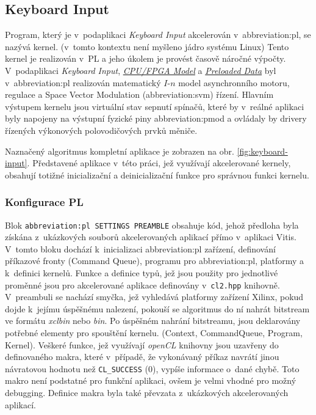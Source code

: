 \documentclass[a4paper, twoside, 11pt]{article}
\newcommand{\fbar}{\FloatBarrier}
\begin{document}
	\fbar
	\subsection{Keyboard Input}\label{subsec:keyboard-input}
		Program, který je v~podaplikaci \textit{Keyboard Input} akcelerován v~\gls{abbreviation:pl}, se nazývá kernel. (v~tomto kontextu není myšleno jádro systému Linux) Tento kernel je realizován v~PL a jeho úkolem je provést časově náročné výpočty. V~podaplikaci \textit{Keyboard Input}, \hyperref[subsec:cpu-fpga]{\textit{CPU/FPGA Model}} a \hyperref[subsec:preloaded-data]{\textit{Preloaded Data}} byl v~\gls{abbreviation:pl} realizován matematický $I$-$n$ model asynchronního motoru, regulace a Space Vector Modulation (\gls{abbreviation:svm}) řízení. Hlavním výstupem kernelu jsou virtuální stav sepnutí spínačů, které by v~reálné aplikaci byly napojeny na výstupní fyzické piny \gls{abbreviation:pmod} a ovládaly by drivery řízených výkonových polovodičových prvků měniče.\par
		Naznačený algoritmus kompletní aplikace je zobrazen na obr. \ref{fig:keyboard-input}. Představené aplikace v~této práci, jež využívají akcelerované kernely, obsahují totižné inicializační a deinicializační funkce pro správnou funkci kernelu.\par
		\subsubsection{Konfigurace PL}
		Blok \texttt{\gls{abbreviation:pl} SETTINGS PREAMBLE} obsahuje kód, jehož předloha byla získána z~ukázkových souborů akcelerovaných aplikací přímo v~aplikaci Vitis. V~tomto bloku dochází k~inicializaci \gls{abbreviation:pl} zařízení, definování příkazové fronty (Command Queue), programu pro \gls{abbreviation:pl}, platformy a k~definici kernelů. Funkce a definice typů, jež jsou použity pro jednotlivé proměnné jsou pro akcelerované aplikace definovány v~\texttt{cl2.hpp} knihovně. V~preambuli se nachází smyčka, jež vyhledává platformy zařízení Xilinx, pokud dojde k~jejímu úspěšnému nalezení, pokouší se algoritmus do ní nahrát bitstream ve formátu \textit{xclbin} nebo \textit{bin}. Po úspěšném nahrání bitstreamu, jsou deklarovány potřebné elementy pro spouštění kernelu. (Context, CommandQueue, Program, Kernel). Veškeré funkce, jež využívají \textit{openCL} knihovny jsou  uzavřeny do definovaného makra, které v~případě, že vykonávaný příkaz navrátí jinou návratovou hodnotu než \texttt{CL\_SUCCESS} (0), vypíše informace o~dané chybě. Toto makro není podstatné pro funkční aplikaci, ovšem je velmi vhodné pro možný debugging. Definice makra byla také převzata z~ukázkových akcelerovaných aplikací.
\end{document}
